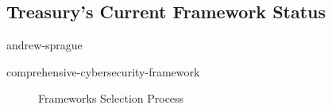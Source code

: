 \documentclass[12pt]{article}
\begin{document}
               \subsection{Treasury's Current Framework Status}
     
                                        {andrew-sprague}

                                        {comprehensive-cybersecurity-framework}

\cleardoublepage

\begin{figure}[tb] 
\centering
\caption{Frameworks Selection Process}
\label{fig:Fig1}
\end{figure}
\end{document}

